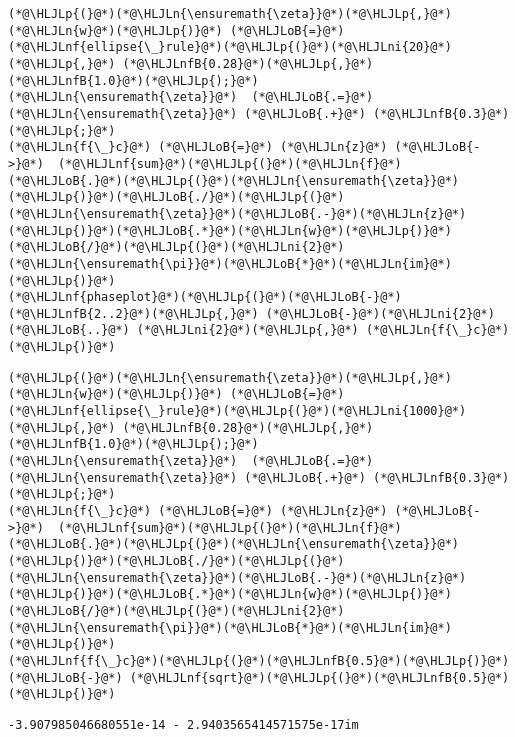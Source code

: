 \documentclass[12pt,landscape]{article}
\newcommand{\HLJLn}[1]{#1}
\newcommand{\HLJLnf}[1]{\textcolor[RGB]{66,102,213}{#1}}
\newcommand{\HLJLnfB}[1]{\textcolor[RGB]{59,151,46}{#1}}
\newcommand{\HLJLni}[1]{\textcolor[RGB]{59,151,46}{#1}}
\newcommand{\HLJLoB}[1]{\textcolor[RGB]{102,102,102}{\textbf{#1}}}
\newcommand{\HLJLp}[1]{#1}
\begin{document}
{\newpage
\begin{lstlisting}
(*@\HLJLp{(}@*)(*@\HLJLn{\ensuremath{\zeta}}@*)(*@\HLJLp{,}@*) (*@\HLJLn{w}@*)(*@\HLJLp{)}@*) (*@\HLJLoB{=}@*) (*@\HLJLnf{ellipse{\_}rule}@*)(*@\HLJLp{(}@*)(*@\HLJLni{20}@*)(*@\HLJLp{,}@*) (*@\HLJLnfB{0.28}@*)(*@\HLJLp{,}@*) (*@\HLJLnfB{1.0}@*)(*@\HLJLp{);}@*)
(*@\HLJLn{\ensuremath{\zeta}}@*)  (*@\HLJLoB{.=}@*) (*@\HLJLn{\ensuremath{\zeta}}@*) (*@\HLJLoB{.+}@*) (*@\HLJLnfB{0.3}@*)(*@\HLJLp{;}@*)
(*@\HLJLn{f{\_}c}@*) (*@\HLJLoB{=}@*) (*@\HLJLn{z}@*) (*@\HLJLoB{->}@*)  (*@\HLJLnf{sum}@*)(*@\HLJLp{(}@*)(*@\HLJLn{f}@*)(*@\HLJLoB{.}@*)(*@\HLJLp{(}@*)(*@\HLJLn{\ensuremath{\zeta}}@*)(*@\HLJLp{)}@*)(*@\HLJLoB{./}@*)(*@\HLJLp{(}@*)(*@\HLJLn{\ensuremath{\zeta}}@*)(*@\HLJLoB{.-}@*)(*@\HLJLn{z}@*)(*@\HLJLp{)}@*)(*@\HLJLoB{.*}@*)(*@\HLJLn{w}@*)(*@\HLJLp{)}@*)(*@\HLJLoB{/}@*)(*@\HLJLp{(}@*)(*@\HLJLni{2}@*)(*@\HLJLn{\ensuremath{\pi}}@*)(*@\HLJLoB{*}@*)(*@\HLJLn{im}@*)(*@\HLJLp{)}@*)
(*@\HLJLnf{phaseplot}@*)(*@\HLJLp{(}@*)(*@\HLJLoB{-}@*)(*@\HLJLnfB{2..2}@*)(*@\HLJLp{,}@*) (*@\HLJLoB{-}@*)(*@\HLJLni{2}@*) (*@\HLJLoB{..}@*) (*@\HLJLni{2}@*)(*@\HLJLp{,}@*) (*@\HLJLn{f{\_}c}@*)(*@\HLJLp{)}@*)
\end{lstlisting}

\begin{lstlisting}
(*@\HLJLp{(}@*)(*@\HLJLn{\ensuremath{\zeta}}@*)(*@\HLJLp{,}@*) (*@\HLJLn{w}@*)(*@\HLJLp{)}@*) (*@\HLJLoB{=}@*) (*@\HLJLnf{ellipse{\_}rule}@*)(*@\HLJLp{(}@*)(*@\HLJLni{1000}@*)(*@\HLJLp{,}@*) (*@\HLJLnfB{0.28}@*)(*@\HLJLp{,}@*) (*@\HLJLnfB{1.0}@*)(*@\HLJLp{);}@*)
(*@\HLJLn{\ensuremath{\zeta}}@*)  (*@\HLJLoB{.=}@*) (*@\HLJLn{\ensuremath{\zeta}}@*) (*@\HLJLoB{.+}@*) (*@\HLJLnfB{0.3}@*)(*@\HLJLp{;}@*)
(*@\HLJLn{f{\_}c}@*) (*@\HLJLoB{=}@*) (*@\HLJLn{z}@*) (*@\HLJLoB{->}@*)  (*@\HLJLnf{sum}@*)(*@\HLJLp{(}@*)(*@\HLJLn{f}@*)(*@\HLJLoB{.}@*)(*@\HLJLp{(}@*)(*@\HLJLn{\ensuremath{\zeta}}@*)(*@\HLJLp{)}@*)(*@\HLJLoB{./}@*)(*@\HLJLp{(}@*)(*@\HLJLn{\ensuremath{\zeta}}@*)(*@\HLJLoB{.-}@*)(*@\HLJLn{z}@*)(*@\HLJLp{)}@*)(*@\HLJLoB{.*}@*)(*@\HLJLn{w}@*)(*@\HLJLp{)}@*)(*@\HLJLoB{/}@*)(*@\HLJLp{(}@*)(*@\HLJLni{2}@*)(*@\HLJLn{\ensuremath{\pi}}@*)(*@\HLJLoB{*}@*)(*@\HLJLn{im}@*)(*@\HLJLp{)}@*)
(*@\HLJLnf{f{\_}c}@*)(*@\HLJLp{(}@*)(*@\HLJLnfB{0.5}@*)(*@\HLJLp{)}@*) (*@\HLJLoB{-}@*) (*@\HLJLnf{sqrt}@*)(*@\HLJLp{(}@*)(*@\HLJLnfB{0.5}@*)(*@\HLJLp{)}@*)
\end{lstlisting}

\begin{lstlisting}
-3.907985046680551e-14 - 2.9403565414571575e-17im
\end{lstlisting}


}
\end{document}
